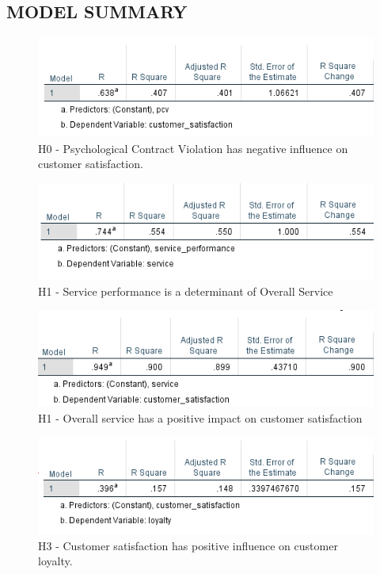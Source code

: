 \documentclass[a4paper, 14pt]{article}
\begin{document}
{\subsection*{MODEL SUMMARY}
\begin{figure}[H]
\centering
\includegraphics[scale=1]{pcv_vs_customer_satisfaction.png}
\caption{H0 - Psychological Contract Violation has negative influence on customer satisfaction.}
\end{figure}

\begin{figure}[H]
\centering
\includegraphics[scale=1]{service_performance_vs_service.png}
\caption{H1 - Service performance is a determinant of Overall Service}
\end{figure}

\begin{figure}[H]
\centering
\includegraphics[scale=1]{sp_vs_cs.png}
\caption{H1 - Overall service has a positive impact on customer satisfaction}
\end{figure}


\begin{figure}[H]
\centering
\includegraphics[scale=1]{customer_satisfaction_vs_loyalty.png}
\caption{H3 - Customer satisfaction has positive influence on customer loyalty.}
\end{figure}

}
\end{document}
